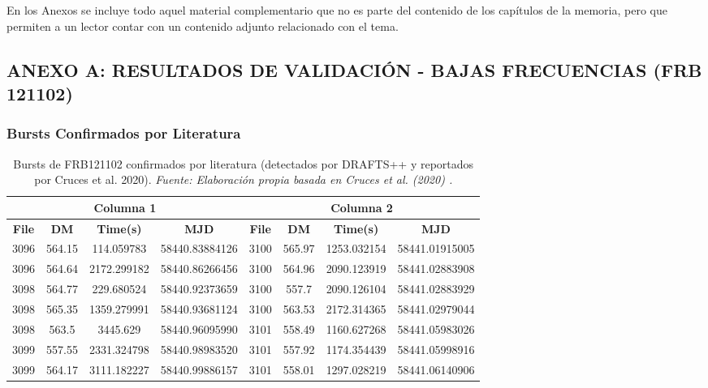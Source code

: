
En los Anexos se incluye todo aquel material complementario que no es parte del contenido de los capítulos de la memoria, pero que permiten a un lector contar con un contenido adjunto relacionado con el tema.

\subsection{ANEXO A: RESULTADOS DE VALIDACIÓN - BAJAS FRECUENCIAS (FRB 121102)}

\subsubsection{Bursts Confirmados por Literatura}

\begin{table}[H]
    \centering
    \caption{Bursts de FRB121102 confirmados por literatura (detectados por DRAFTS++ y reportados por Cruces et al. 2020). \textit{Fuente: Elaboración propia basada en Cruces et al. (2020) \cite{cruces2020frb121102}.}}
    \label{tab:anexo_confirmed_bursts}
    \begin{tabular}{|c|c|c|c|c|c|c|c|}
        \hline
        \multicolumn{4}{|c|}{\textbf{Columna 1}} & \multicolumn{4}{|c|}{\textbf{Columna 2}} \\
        \hline
        \textbf{File} & \textbf{DM} & \textbf{Time(s)} & \textbf{MJD} & \textbf{File} & \textbf{DM} & \textbf{Time(s)} & \textbf{MJD} \\
        \hline
        3096 & 564.15 & 114.059783 & 58440.83884126 & 3100 & 565.97 & 1253.032154 & 58441.01915005 \\
        3096 & 564.64 & 2172.299182 & 58440.86266456 & 3100 & 564.96 & 2090.123919 & 58441.02883908 \\
        3098 & 564.77 & 229.680524 & 58440.92373659 & 3100 & 557.7 & 2090.126104 & 58441.02883929 \\
        3098 & 565.35 & 1359.279991 & 58440.93681124 & 3100 & 563.53 & 2172.314365 & 58441.02979044 \\
        3098 & 563.5 & 3445.629 & 58440.96095990 & 3101 & 558.49 & 1160.627268 & 58441.05983026 \\
        3099 & 557.55 & 2331.324798 & 58440.98983520 & 3101 & 557.92 & 1174.354439 & 58441.05998916 \\
        3099 & 564.17 & 3111.182227 & 58440.99886157 & 3101 & 558.01 & 1297.028219 & 58441.06140906 \\

\end{tabular}
\end{table}

